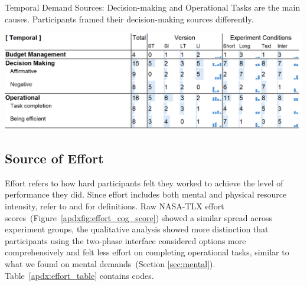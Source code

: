 \begin{table}[p]
    \caption{Temporal Demand Sources: Decision-making and Operational Tasks are the main causes. Participants framed their decision-making sources differently.}

    \label{tbl:temporal}
    \includegraphics[width=0.9\linewidth]{content/image/cog/temporal_table.png}
\end{table}


\subsection{Source of Effort}
\label{apdx:effort}
Effort refers to how hard participants felt they worked to achieve the level of performance they did. Since effort includes both mental and physical resource intensity, refer to  and  for definitions. Raw NASA-TLX effort scores~(Figure~\ref{apdxfig:effort_cog_score}) showed a similar spread across experiment groups, the qualitative analysis showed more distinction that participants using the two-phase interface considered options more comprehensively and felt less effort on completing operational tasks, similar to what we found on mental demands~(Section \ref{sec:mental}). Table~\ref{apdx:effort_table} contains codes.

